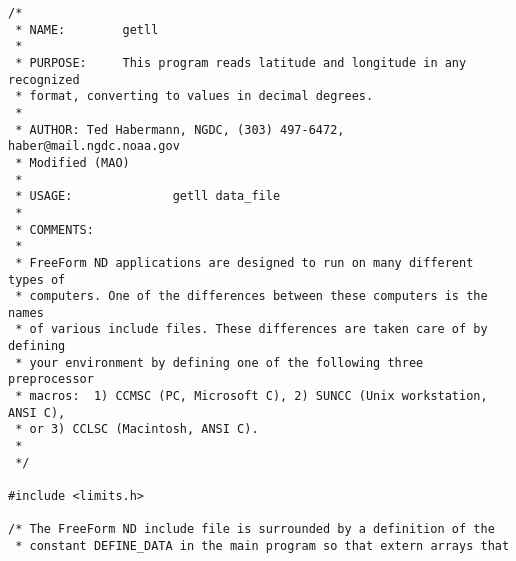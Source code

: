 \begin{verbatim}
/*
 * NAME:        getll
 *
 * PURPOSE:     This program reads latitude and longitude in any recognized 
 * format, converting to values in decimal degrees.
 *
 * AUTHOR: Ted Habermann, NGDC, (303) 497-6472, haber@mail.ngdc.noaa.gov
 * Modified (MAO)
 *
 * USAGE:              getll data_file
 *
 * COMMENTS:
 *
 * FreeForm ND applications are designed to run on many different types of
 * computers. One of the differences between these computers is the names
 * of various include files. These differences are taken care of by defining
 * your environment by defining one of the following three preprocessor
 * macros:  1) CCMSC (PC, Microsoft C), 2) SUNCC (Unix workstation, ANSI C),
 * or 3) CCLSC (Macintosh, ANSI C).  
 *
 */

#include <limits.h>

/* The FreeForm ND include file is surrounded by a definition of the
 * constant DEFINE_DATA in the main program so that extern arrays that
\end{verbatim}
\subj{}
\vspace{-2.75\baselineskip}

